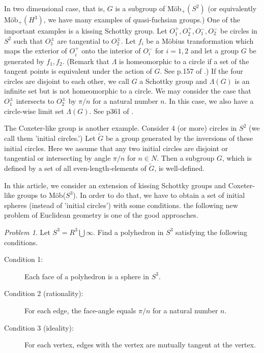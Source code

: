 \documentclass[suppldata, dvipdfmx]{interact}
\theoremstyle{plain}%
\theoremstyle{definition}
\theoremstyle{remark}
\theoremstyle{problemstyle}
\newtheorem{problem}{Problem}[section] %
\begin{document}
In two dimensional case, that is, $G$ is a subgroup of M\"ob$_+(S^2)$
(or equivalently M\"ob$_+(H^3)$, we have many examples of quasi-fuchsian
groups.) One of the important examples is a kissing Schottky group.
Let $O_1^+, O_2^+, O_1^-, O_2^-$ be circles in $S^2$ such that
$O_1^{\pm}$ are tangential to $O_2^{\pm}$. Let $f_i$ be a M\"obius
transformation which maps the exterior of $O_i^+$ onto the interior of
$O_i^{-}$ for $i = 1, 2$ and let a group $G$ be generated by $f_1, f_2$.
(Remark that $\Lambda$ is homeomorphic to a circle if a set of the
tangent points is equivalent under the action of $G$. See p.157 of
\cite{indra}.)
If the four circles are disjoint to each
other, we call $G$ a Schottky group and $\Lambda(G)$ is an infinite set
but is not homeomorphic to a circle. We may consider the case that
$O_1^{\pm}$ intersects to $O_2^{\pm}$ by $\pi/n$ for a natural number
$n$. In this case, we also have a circle-wise limit set $\Lambda(G)$.
See p361 of \cite{indra}.

The Coxeter-like group is another example. Consider 4 (or more) circles in
$S^2$ (we call them 'initial circles.') Let $\tilde G$ be a group generated
by the inversions of these initial circles. Here we assume that any two
initial circles are disjoint or tangential or intersecting  by angle
$\pi/n$ for $n \in N$. Then a subgroup $G$, which is defined by a set of
all even-length-elements of $\tilde G$, is well-defined.

In this article, we consider an extension of kissing Schottky groups and
Coxeter-like groups to M\"ob($S^3$). In order to do that, we have to
obtain a set of initial spheres (instead of 'initial circles') with some
conditions. the following new problem of Euclidean geometry is
one of the good approaches.

\begin{problem}
 Let $S^3 = R^3 \bigcup {\infty}$. Find a polyhedron in $S^3$ satisfying
 the following conditions.
 \begin{description}
  \item[Condition 1:] Each face of a polyhedron is a sphere in $S^3$.
  \item[Condition 2 (rationality):] For each edge, the face-angle equals $\pi/n$
             for a natural number $n$.
  \item[Condition 3 (ideality):] For each vertex, edges with the vertex are
             mutually tangent at the vertex.
 \end{description}
\end{problem}
\end{document}
